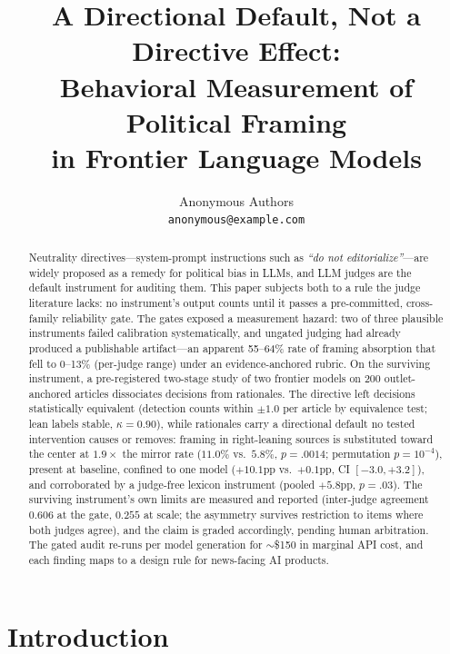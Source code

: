 \documentclass{article}
\title{A Directional Default, Not a Directive Effect:\\
Behavioral Measurement of Political Framing\\
in Frontier Language Models}
\author{Anonymous Authors\\
\texttt{anonymous@example.com}}
\newcommand{\kap}{\kappa}
\begin{document}
\maketitle

\begin{abstract}
Neutrality directives---system-prompt instructions such as \emph{``do not
editorialize''}---are widely proposed as a remedy for political bias in
LLMs, and LLM judges are the default instrument for auditing them. This
paper subjects both to a rule the judge literature lacks: no instrument's
output counts until it passes a pre-committed, cross-family reliability
gate. The gates exposed a measurement hazard: two of three plausible
instruments failed calibration systematically, and ungated judging had
already produced a publishable artifact---an apparent 55--64\% rate of
framing absorption that fell to 0--13\% (per-judge range) under an
evidence-anchored rubric. On the surviving instrument, a pre-registered two-stage study of
two frontier models on 200 outlet-anchored articles dissociates decisions
from rationales. The directive left decisions statistically equivalent
(detection counts within $\pm1.0$ per article by equivalence test; lean labels stable,
$\kap=0.90$), while rationales carry a directional default no tested
intervention causes or removes: framing in right-leaning sources is
substituted toward the center at $1.9\times$ the mirror rate ($11.0\%$
vs.\ $5.8\%$, $p=.0014$; permutation $p=10^{-4}$), present at baseline,
confined to one model ($+10.1$pp vs.\ $+0.1$pp, CI $[-3.0,+3.2]$),
and corroborated by a judge-free lexicon
instrument (pooled $+5.8$pp, $p=.03$). The surviving instrument's own limits are measured and reported
(inter-judge agreement $0.606$ at the gate, $0.255$ at scale; the
asymmetry survives restriction to items where both judges agree), and
the claim is graded accordingly, pending human arbitration. The gated audit
re-runs per model generation for $\sim$\$150 in marginal API cost, and
each finding maps to a design rule for news-facing AI products.
\end{abstract}

\section{Introduction}
\end{document}
